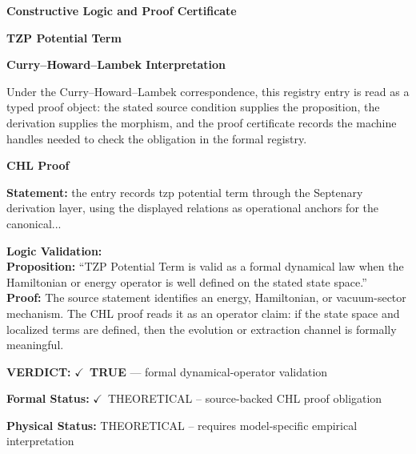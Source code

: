 \clearpage
\begingroup\tzpsupportsetup
\noindent\textbf{\fontsize{10.8pt}{12.8pt}\selectfont [ID 0693] Constructive Logic and Proof Certificate}\par
\noindent\textbf{\fontsize{10pt}{12pt}\selectfont TZP Potential Term}\par
\vspace{0.45em}
\begingroup
\footnotesize
\setlength{\parskip}{0.22em}
\setlength{\parindent}{0pt}
\noindent\textbf{Curry--Howard--Lambek Interpretation}\par
Under the Curry--Howard--Lambek correspondence, this registry entry is read as a typed proof
object: the stated source condition supplies the proposition, the derivation supplies the
morphism, and the proof certificate records the machine handles needed to check the obligation
in the formal registry.

\vspace{0.45em}
\noindent\textbf{CHL Proof}\par
\textbf{Statement:} the entry records tzp potential term through the Septenary derivation layer, using the
displayed relations as operational anchors for the canonical...

\textbf{Logic Validation:}\\
\textbf{Proposition:} ``TZP Potential Term is valid as a formal dynamical law when the Hamiltonian or energy
operator is well defined on the stated state space.''\\
\textbf{Proof:} The source statement identifies an energy, Hamiltonian, or vacuum-sector mechanism. The
CHL proof reads it as an operator claim: if the state space and localized terms are
defined, then the evolution or extraction channel is formally meaningful.

\textbf{VERDICT:} \ensuremath{\checkmark}\ \textbf{TRUE} --- formal dynamical-operator validation

\textbf{Formal Status:} \ensuremath{\checkmark}\ THEORETICAL -- source-backed CHL proof obligation

\textbf{Physical Status:} THEORETICAL -- requires model-specific empirical interpretation
\par\vspace{0.45em}
\par
\ifTZPDarkEdition
{}
\fi
\endgroup
\endgroup
